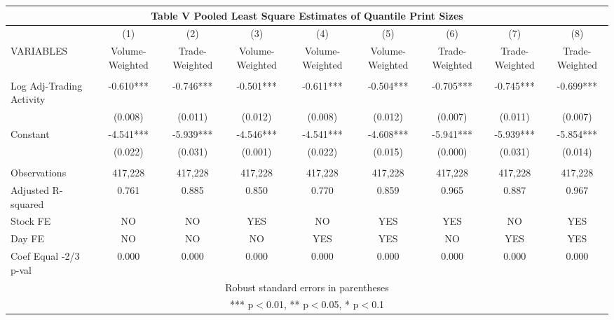 \documentclass[]{article}
\begin{document}
\begin{tabular}{lcccccccc}
\multicolumn{9}{c}{Table V Pooled Least Square Estimates of Quantile Print Sizes} \\ \hline
 & (1) & (2) & (3) & (4) & (5) & (6) & (7) & (8) \\
VARIABLES & Volume-Weighted & Trade-Weighted & Volume-Weighted & Volume-Weighted & Volume-Weighted & Trade-Weighted & Trade-Weighted & Trade-Weighted \\ \hline
 &  &  &  &  &  &  &  &  \\
Log Adj-Trading Activity & -0.610*** & -0.746*** & -0.501*** & -0.611*** & -0.504*** & -0.705*** & -0.745*** & -0.699*** \\
 & (0.008) & (0.011) & (0.012) & (0.008) & (0.012) & (0.007) & (0.011) & (0.007) \\
Constant & -4.541*** & -5.939*** & -4.546*** & -4.541*** & -4.608*** & -5.941*** & -5.939*** & -5.854*** \\
 & (0.022) & (0.031) & (0.001) & (0.022) & (0.015) & (0.000) & (0.031) & (0.014) \\
 &  &  &  &  &  &  &  &  \\
Observations & 417,228 & 417,228 & 417,228 & 417,228 & 417,228 & 417,228 & 417,228 & 417,228 \\
Adjusted R-squared & 0.761 & 0.885 & 0.850 & 0.770 & 0.859 & 0.965 & 0.887 & 0.967 \\
Stock FE & NO & NO & YES & NO & YES & YES & NO & YES \\
Day FE & NO & NO & NO & YES & YES & NO & YES & YES \\
 Coef Equal -2/3 p-val & 0.000 & 0.000 & 0.000 & 0.000 & 0.000 & 0.000 & 0.000 & 0.000 \\ \hline
\multicolumn{9}{c}{ Robust standard errors in parentheses} \\
\multicolumn{9}{c}{ *** p$<$0.01, ** p$<$0.05, * p$<$0.1} \\
\end{tabular}
\end{document}

